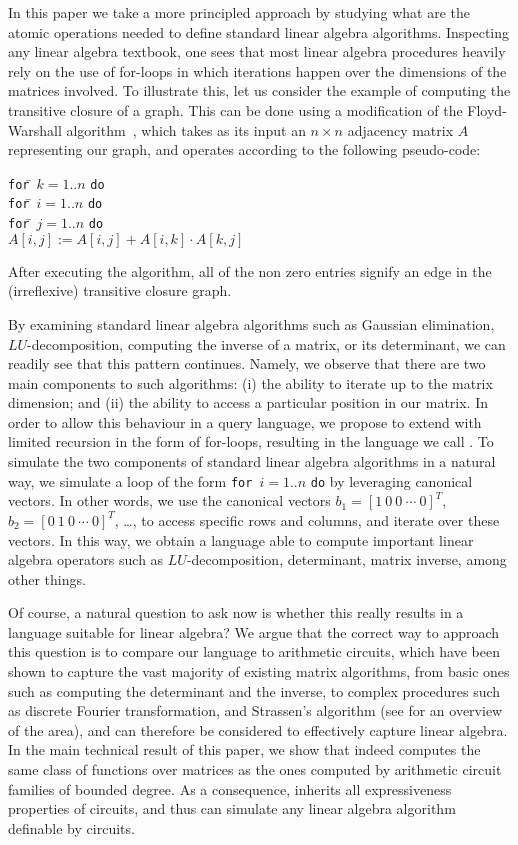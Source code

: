 In this paper we take a more principled approach by studying what are the atomic operations needed to define standard linear algebra algorithms. Inspecting any linear algebra textbook, one sees that most linear algebra procedures heavily rely on the use of for-loops in which iterations happen over the dimensions of the matrices involved. To illustrate this, let us consider the example of computing the transitive closure of a graph. This can be done using a modification of the Floyd-Warshall algorithm~\cite{cormen}, which takes as its input an $n\times n$ adjacency matrix $A$ representing our graph, and operates according to the following pseudo-code:
\begin{tabbing}
\quad\texttt{for}\=\,  $k = 1..n$ \texttt{do}\\
\> \texttt{for}\=\,  $i = 1..n$ \texttt{do}\\
\> \> \texttt{for}\=\,  $j = 1..n$ \texttt{do}\\
\> \> \> $A[i,j] := A[i,j] + A[i,k] \cdot A[k,j]$
\end{tabbing}
After executing the algorithm, all of the non zero entries signify an edge in the (irreflexive) transitive closure graph.

By examining standard linear algebra algorithms such as Gaussian elimination, $LU$-decomposition, computing the inverse of a matrix, or its determinant, we can readily see that this pattern continues. Namely, we observe that there are two main components to such algorithms: (i) the ability to iterate up to the matrix dimension; and (ii) the ability to access a particular position in our matrix. In order to allow this behaviour in a query language, we propose to extend \lang with limited recursion in the form of for-loops, resulting in the language we call \langfor. To  simulate the two components of standard linear algebra algorithms in a natural way, we simulate a loop of the form \texttt{for}\, $i=1..n$ \texttt{do} by leveraging canonical vectors. In other words, we use the canonical vectors $b_1=[1\ 0\ 0\ \cdots\ 0]^T$, $b_2=[0\ 1\ 0\ \cdots\ 0]^T$, \ldots, to access specific rows and columns, and iterate over these vectors. In this way,
we obtain a language able to compute important linear algebra operators such as $LU$-decomposition, determinant, matrix inverse, among other things.

Of course, a natural question to ask now is whether this really results in a language suitable for linear algebra? We argue that the correct way to approach this question is to compare our language to arithmetic circuits, which have been shown to capture the vast majority of existing matrix algorithms, from basic ones such as computing the determinant and the inverse, to complex procedures such as discrete Fourier transformation, and Strassen's algorithm (see \cite{ShpilkaY10,allender} for an overview of the area), and can therefore be considered to effectively capture linear algebra. In the main technical result of this paper, we show that \langfor indeed computes the same class of functions over matrices as the ones computed by arithmetic circuit families of bounded degree.  As a consequence, \langfor inherits all expressiveness properties of circuits, and thus can simulate any linear algebra algorithm definable by circuits.

